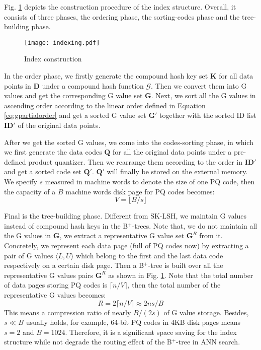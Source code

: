 \documentclass[twocolumn]{svjour3}          %
\begin{document}
Fig. \ref{fig:indexing} depicts the construction procedure of the index structure. Overall, it consists of three phases, the ordering phase, the sorting-codes phase and the tree-building phase.
\begin{figure}
  \centering
  \texttt{[image: indexing.pdf]}\\
  \caption{Index construction}\label{fig:indexing}
\end{figure}

In the order phase, we firstly generate the compound hash key set $\textbf{K}$ for all data points in $\textbf{D}$ under a compound hash function $\mathcal{G}$. Then we convert them into G values and get the corresponding G value set $\textbf{G}$. Next, we sort all the G values in ascending order according to the linear order defined in Equation \ref{eq:gpartialorder} and get a sorted G value set $\textbf{G}'$ together with the sorted ID list $\textbf{ID}'$ of the original data points.

After we get the sorted G values, we come into the codes-sorting phase, in which we first generate the data codes $\textbf{Q}$ for all the original data points under a pre-defined product quantizer. Then we rearrange them according to the order in $\textbf{ID}'$ and get a sorted code set $\textbf{Q}'$. $\textbf{Q}'$ will finally be stored on the external memory. We specify $s$ measured in machine words to denote the size of one PQ code, then the capacity of a $B$ machine words disk page for PQ codes becomes:
\begin{equation}\label{eq:vq}
V=\lfloor B/s \rfloor
\end{equation}

Final is the tree-building phase. Different from SK-LSH, we maintain G values instead of compound hash keys in the B$^+$-trees. Note that, we do not maintain all the G values in $\textbf{G}$, we extract a representative G value set $\textbf{G}^R$ from it. Concretely, we represent each data page (full of PQ codes now) by extracting a pair of G values $\langle L, U \rangle$ which belong to the first and the last data code respectively on a certain disk page. Then a B$^+$-tree is built over all the representative G values pairs $\textbf{G}^R$ as shown in Fig. \ref{fig:indexing}. Note that the total number of data pages storing PQ codes is $\lceil n/V \rceil$, then the total number of the representative G values becomes:
\begin{equation}\label{eq:nrepg}
R = 2\lceil n/V \rceil \approx 2ns/B
\end{equation}
This means a compression ratio of nearly ${B}/{(2s)}$ of G value storage. Besides, $s \ll B$ usually holds, for example, 64-bit PQ codes in 4KB disk pages means $s=2$ and $B=1024$. Therefore, it is a significant space saving for the index structure while not degrade the routing effect of the B$^+$-tree in ANN search.
\end{document}
